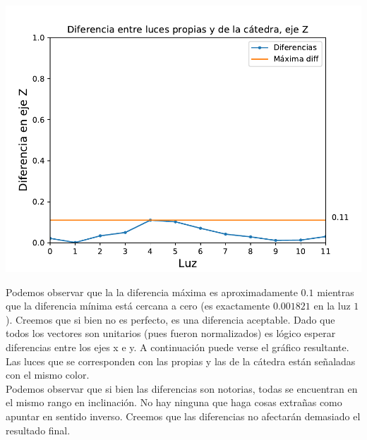 {\centering
    \includegraphics[scale=0.7]{informe/imagenes/lucesEjezDiferencias.pdf} \\
}

Podemos observar que la la diferencia máxima es aproximadamente $0.1$ mientras que la diferencia mínima está cercana a cero (es exactamente $0.001821$ en la luz $1$). Creemos que si bien no es perfecto, es una diferencia aceptable. Dado que todos los vectores son unitarios (pues fueron normalizados) es lógico esperar diferencias entre los ejes x e y. A continuación puede verse el gráfico resultante. Las luces que se corresponden con las propias y las de la cátedra están señaladas con el mismo color. \\

Podemos observar que si bien las diferencias son notorias, todas se encuentran en el mismo rango en inclinación. No hay ninguna que haga cosas extrañas como apuntar en sentido inverso. Creemos que las diferencias no afectarán demasiado el resultado final.

